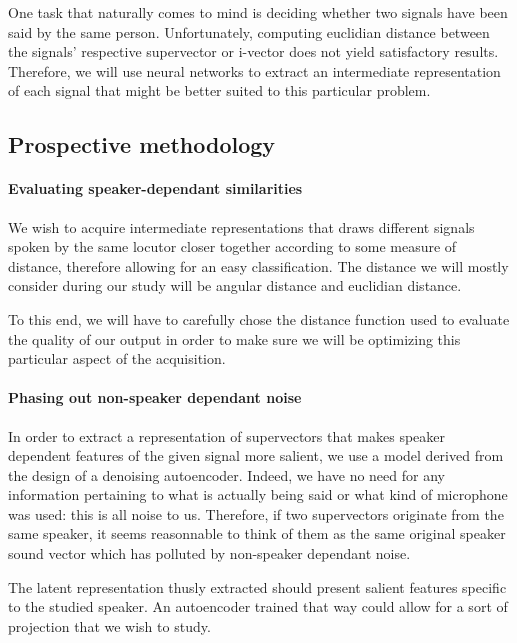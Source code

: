 \documentclass[conference]{IEEEtran}
\begin{document}
One task that naturally comes to mind is deciding whether two signals have been
said by the same person. Unfortunately, computing euclidian distance between the signals'
respective supervector or i-vector does not yield satisfactory results.
Therefore, we will use neural networks to extract an intermediate representation
of each signal that might be better suited to this particular problem.

\subsection{Prospective methodology}
\label{subsec:prosp}

\paragraph{Evaluating speaker-dependant similarities}

We wish to acquire intermediate representations that draws different signals
spoken by the same locutor closer together according to some measure of
distance, therefore allowing for an easy classification. The distance we will
mostly consider during our study will be angular distance and euclidian
distance.

To this end, we will have to carefully chose the distance function used to
evaluate the \og quality\fg{} of our output in order to make sure we will be
optimizing this particular aspect of the acquisition.

\paragraph{Phasing out non-speaker dependant noise}

In order to extract a representation of supervectors that makes speaker
dependent features of the given signal more salient, we use a model derived from
the design of a denoising autoencoder. Indeed, we have no need for any
information pertaining to what is actually being said or what kind of microphone
was used: this is all noise to us. Therefore, if two supervectors originate from
the same speaker, it seems reasonnable to think of them as the same original \og
speaker\fg{} sound vector which has polluted by non-speaker dependant noise.

The latent representation thusly extracted should present salient features
specific to the studied speaker. An autoencoder trained that way could allow for
a sort of projection that we wish to study.
\end{document}
